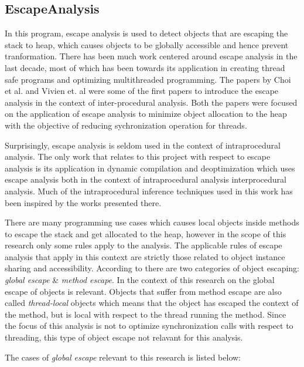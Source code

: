 \subsection{EscapeAnalysis}\label{sec:escape}
In this program, escape analysis is used to detect objects that are escaping the stack to heap, which causes objects to be globally accessible and hence prevent tranformation. There has been much work centered around escape analysis in the last decade, most of which has been towards its application in creating thread safe programs and optimizing multithreaded programming. The papers by Choi et al. and Vivien et. al \cite{ref:escapejava}\cite{ref:incrementalescape} were some of the first papers to introduce the escape analysis in the context of inter-procedural analysis. Both the papers were focused on the application of escape analysis to minimize object allocation to the heap with the objective of reducing sychronization operation for threads.

Surprisingly, escape analysis is seldom used in the context of intraprocedural analysis. The only work that relates to this project with respect to escape analysis is its application in dynamic compilation and deoptimization \cite{ref:globalescape} which uses escape analysis both in the context of intraprocedural analysis interprocedural analysis. Much of the intraprocedural inference techniques used in this work has been inspired by the works presented there.

There are many programming use cases which causes local objects inside methods to escape the stack and get allocated to the heap, however in the scope of this research only some rules apply to the analysis. The applicable rules of escape analysis that apply in this context are strictly those related to object instance sharing and accessibility. According to \cite{ref:globalescape} there are two categories of object escaping: \textit{global escape} \& \textit{method escape}. In the context of this research on the global escape of objects is relevant. Objects that suffer from method escape are also called \textit{thread-local} objects which means that the object has escaped the context of the method, but is local with respect to the thread running the method. Since the focus of this analysis is not to optimize synchronization calls with respect to threading, this type of object escape not relavant for this analysis.

The cases of \textit{global escape} relevant to this research is listed below:

